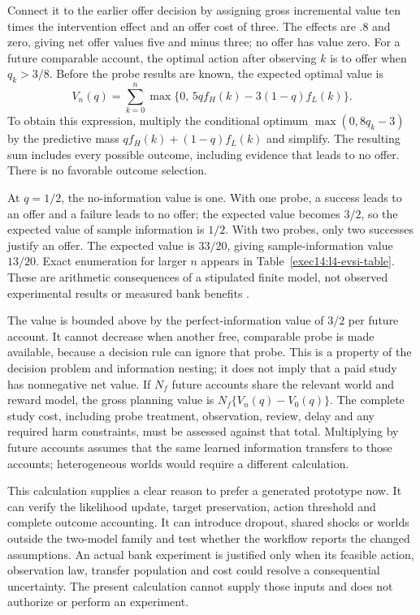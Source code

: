 Connect it to the earlier offer decision by assigning gross incremental value
ten times the intervention effect and an offer cost of three. The effects
are $.8$ and zero, giving net offer values five and minus three; no offer
has value zero. For a future comparable account, the optimal action after
observing $k$ is to offer when $q_k>3/8$. Before the probe results are known,
the expected optimal value is
\begin{equation}
 V_n(q)=\sum_{k=0}^n
       \max\{0,\,5qf_H(k)-3(1-q)f_L(k)\}.
 \label{exec14:l4-sample-information-value}
\end{equation}
To obtain this expression, multiply the conditional optimum
$\max(0,8q_k-3)$ by the predictive mass
$qf_H(k)+(1-q)f_L(k)$ and simplify. The resulting sum includes every possible
outcome, including evidence that leads to no offer. There is no favorable
outcome selection.

At $q=1/2$, the no-information value is one. With one probe, a success leads
to an offer and a failure leads to no offer; the expected value becomes
$3/2$, so the expected value of sample information is $1/2$. With two probes,
only two successes justify an offer. The expected value is $33/20$, giving
sample-information value $13/20$. Exact enumeration for larger $n$ appears
in Table~\ref{exec14:l4-evsi-table}. These are arithmetic consequences of a
stipulated finite model, not observed experimental results or measured bank
benefits \citep{exec14_discovery_design_oracles}.



The value is bounded above by the perfect-information value of $3/2$ per
future account. It cannot decrease when another free, comparable probe is
made available, because a decision rule can ignore that probe. This is a
property of the decision problem and information nesting; it does not imply
that a paid study has nonnegative net value. If $N_f$ future accounts share
the relevant world and reward model, the gross planning value is
$N_f\{V_n(q)-V_0(q)\}$. The complete study cost, including probe treatment,
observation, review, delay and any required harm constraints, must be assessed
against that total. Multiplying by future accounts assumes that the same
learned information transfers to those accounts; heterogeneous worlds would
require a different calculation.

This calculation supplies a clear reason to prefer a generated prototype now.
It can verify the likelihood update, target preservation, action threshold
and complete outcome accounting. It can introduce dropout, shared shocks or
worlds outside the two-model family and test whether the workflow reports
the changed assumptions. An actual bank experiment is justified only when
its feasible action, observation law, transfer population and cost could
resolve a consequential uncertainty. The present calculation cannot supply
those inputs and does not authorize or perform an experiment.

